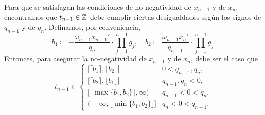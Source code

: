 Para que se satisfagan las condiciones de no negatividad de $x_{n-1}$ y de $x_n$, encontramos que
$t_{n-1} \in \mathbb{Z}$ debe cumplir ciertas desigualdades según los signos de $q_{n-1}$ y de $q_n$.
Definamos, por conveniencia,
\begin{equation}
	\label{eq:lr-bounds}
	b_1 \coloneq -\frac{\omega_{n-1}x_{n-1}'}{q_n} \cdot \prod_{j=1}^{n-1}g_j, \quad
	b_2 \coloneq \frac{\omega_{n-1}x_{n}'}{q_{n-1}} \cdot \prod_{j=1}^{n-1}g_j.
\end{equation}
Entonces, para asegurar la no-negatividad de $x_{n - 1}$ y de $x_n$, debe ser el caso que
\begin{equation}
	\label{eq:feasible-param}
	t_{n-1} \in 
	\begin{cases}
		\big[ \lceil b_1 \rceil, \lfloor b_2 \rfloor \big] &  0 < q_{n-1}, q_n, \\[0.5em]
		\big[ \lceil b_2 \rceil, \lfloor b_1 \rfloor \big] &  q_{n-1}, q_n < 0, \\[0.5em]
		\big[ \lceil \max\lbrace b_1 ,  b_2 \rbrace \rceil, \infty \big) &  q_{n-1}
		< 0 < q_n, \\[0.5em]
		\big( -\infty, \lfloor \min\lbrace b_1, b_2\rbrace \rfloor \big] &  q_n < 0
		< q_{n-1}.
	\end{cases}
\end{equation}

